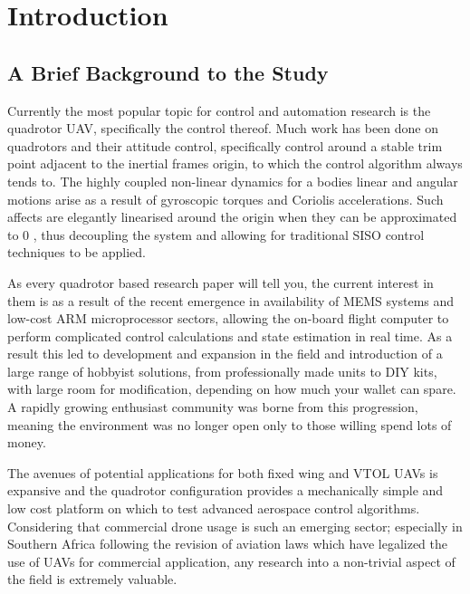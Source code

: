 \chapter{Introduction}
\label{ch:ch1}
\section{A Brief Background to the Study}
\label{sec:ch1.study}
Currently the most popular topic for control and automation research is the quadrotor UAV, specifically the control thereof. Much work has been done on quadrotors and their attitude control, specifically control around a stable trim point adjacent to the inertial frames origin, to which the control algorithm always tends to. The highly coupled non-linear dynamics for a bodies linear and angular motions arise as a result of gyroscopic torques and Coriolis accelerations. Such affects are elegantly linearised around the origin when they can be approximated to 0 \cite{quaddynamics} , thus decoupling the system and allowing for traditional SISO control techniques to be applied.
\par
As every quadrotor based research paper will tell you, the current interest in them is as a result of the recent emergence in availability of MEMS systems and low-cost ARM microprocessor sectors, allowing the on-board flight computer to perform complicated control calculations and state estimation in real time. As a result this led to development and expansion in the field and introduction of a large range of hobbyist solutions, from professionally made units to DIY kits, with large room for modification, depending on how much your wallet can spare. A rapidly growing enthusiast community was borne from this progression, meaning the environment was no longer open only to those willing spend lots of money.
\par
The avenues of potential applications for both fixed wing and VTOL UAVs is expansive and the quadrotor configuration provides a mechanically simple and low cost platform on which to test advanced aerospace control algorithms. Considering that commercial drone usage is such an emerging sector; especially in Southern Africa following the revision of aviation laws \cite{safedrone} which have legalized the use of UAVs for commercial application, any research into a non-trivial aspect of the field is extremely valuable. 
